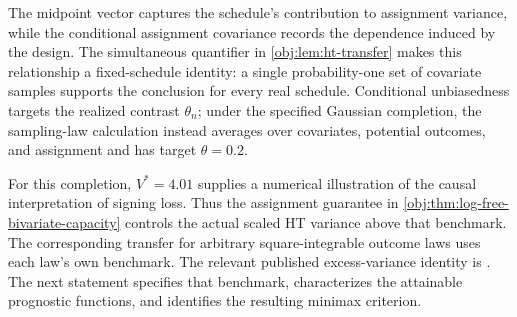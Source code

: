 The midpoint vector  captures the schedule's contribution to assignment variance, while the conditional assignment covariance  records the dependence induced by the design. The simultaneous quantifier in \cref{obj:lem:ht-transfer} makes this relationship a fixed-schedule identity: a single probability-one set of covariate samples supports the conclusion for every real schedule. Conditional unbiasedness targets the realized contrast \(\theta_n\); under the specified Gaussian completion, the sampling-law calculation instead averages over covariates, potential outcomes, and assignment and has target \(\theta=0.2\).

For this completion, \(V^*=4.01\) supplies a numerical illustration of the causal interpretation of signing loss. Thus the assignment guarantee in \cref{obj:thm:log-free-bivariate-capacity} controls the actual scaled HT variance above that benchmark. The corresponding transfer for arbitrary square-integrable outcome laws uses each law's own benchmark. The relevant published excess-variance identity is \citet[Proposition 2.3, equation (2.4), under Assumption 2.1 and Definition 2.2]{Cytrynbaum2026Limits}. The next statement specifies that benchmark, characterizes the attainable prognostic functions, and identifies the resulting minimax criterion.

